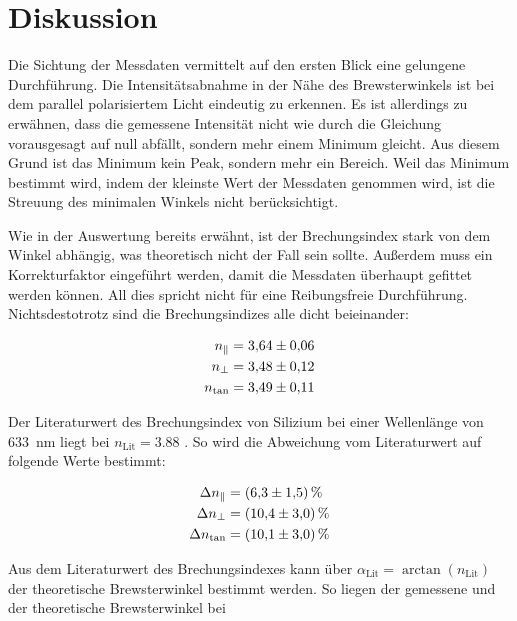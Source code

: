 %

%
\section{Diskussion}
\label{sec:Diskussion}

Die Sichtung der Messdaten vermittelt auf den ersten Blick eine gelungene Durchführung. Die Intensitätsabnahme in der 
Nähe des Brewsterwinkels ist bei dem parallel polarisiertem Licht eindeutig zu erkennen. Es ist allerdings zu erwähnen, 
dass die gemessene Intensität nicht wie durch die Gleichung vorausgesagt auf null abfällt, sondern mehr einem Minimum 
gleicht. Aus diesem Grund ist das Minimum kein Peak, sondern mehr ein Bereich. Weil das Minimum bestimmt wird, indem 
der kleinste Wert der Messdaten genommen wird, ist die Streuung des minimalen Winkels nicht berücksichtigt.

\noindent Wie in der Auswertung bereits erwähnt, ist der Brechungsindex stark von dem Winkel abhängig, was theoretisch nicht der 
Fall sein sollte. Außerdem muss ein Korrekturfaktor eingeführt werden, damit die Messdaten überhaupt gefittet werden 
können. All dies spricht nicht für eine Reibungsfreie Durchführung. \\
\noindent Nichtsdestotrotz sind die Brechungsindizes alle dicht beieinander: 

\begin{align*}
    n_\parallel &= \num{3.64 \pm 0.06}\\
    n_\bot      &= \num{3.48 \pm 0.12}\\
    n_\text{tan} &=\num{3.49\pm0.11}
\end{align*}

\noindent Der Literaturwert des Brechungsindex von Silizium bei einer Wellenlänge von \qty{633}{\nano\meter} liegt bei 
$n_\text{Lit}=\num{3.88}$ \cite{Brechungsindex_SI}. So wird die Abweichung vom Literaturwert auf folgende Werte bestimmt:

\begin{align*}
    \Delta n_\parallel &= \qty{6.3  \pm 1.5}{\percent}\\
    \Delta n_\bot      &= \qty{10.4 \pm 3.0}{\percent}\\
    \Delta n_\text{tan} &=\qty{10.1 \pm 3.0}{\percent}
\end{align*}

\noindent Aus dem Literaturwert des Brechungsindexes kann über $\alpha_\text{Lit}=\arctan{(n_\text{Lit})}$ der theoretische 
Brewsterwinkel bestimmt werden. So liegen der gemessene und der theoretische Brewsterwinkel bei

